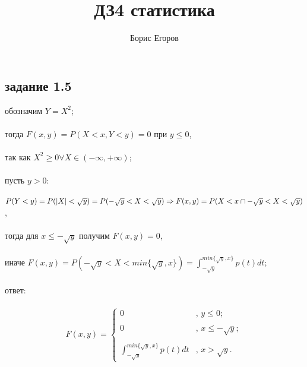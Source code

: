 \documentclass[a4paper]{article}
\author{Борис Егоров}
\title{ДЗ4 статистика}
\begin{document}
	\maketitle
	\begin{large}
	\section*{задание 1.5}
	обозначим $Y=X^2$;\\\\
	тогда $F(x,y)=P(X<x,Y<y)=0$ при $y\le0$,\\\\
	так как $X^2\ge0 \forall X\in (-\infty,+\infty)$;\\\\
	пусть $y>0$:\\\\
	$P(Y<y)=P(|X|<\sqrt{y})=P(-\sqrt{y}<X<\sqrt{y})\Rightarrow\\\\
	F(x,y)=P(X<x\cap-\sqrt{y}<X<\sqrt{y})$,\\\\
	тогда для $x\le-\sqrt{y}$ получим $F(x,y)=0$,\\\\
	иначе $F(x,y)=P(-\sqrt{y}<X<min\{\sqrt{y},x\})=\int_{-\sqrt{y}}^{min\{\sqrt{y},x\}}p(t)dt$;\\\\
	ответ:\\\\
	\[ F(x,y) = \left\{ \begin{array}{ll}
		0 & \mbox{, $y\le0$};\\
		\\
		0 & \mbox{, $x\le-\sqrt{y}$};\\
		\\
		\int_{-\sqrt{y}}^{min\{\sqrt{y},x\}}p(t)dt & \mbox{, $x>\sqrt{y}$}.\end{array} \right. \]
	\end{large}
\end{document}
